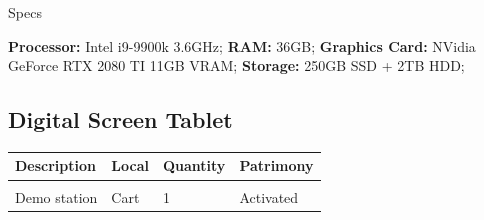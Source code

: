 {\Large Specs}
\vspace{1em}

\textbf{Processor:} Intel i9-9900k 3.6GHz; \textbf{RAM:} 36GB; \textbf{Graphics Card:} NVidia GeForce RTX 2080 TI 11GB VRAM; \textbf{Storage:} 250GB SSD + 2TB HDD;
\newpage

\subsection{Digital Screen Tablet}
\begin{tabularx}{\textwidth}{ Y  Y  Y  Y }
    \textbf{Description} &  \textbf{Local} &  \textbf{Quantity} & \textbf{Patrimony}\\
    \hline \\
     Demo station & Cart & 1 & Activated
\end{tabularx}
\vspace{1cm}

